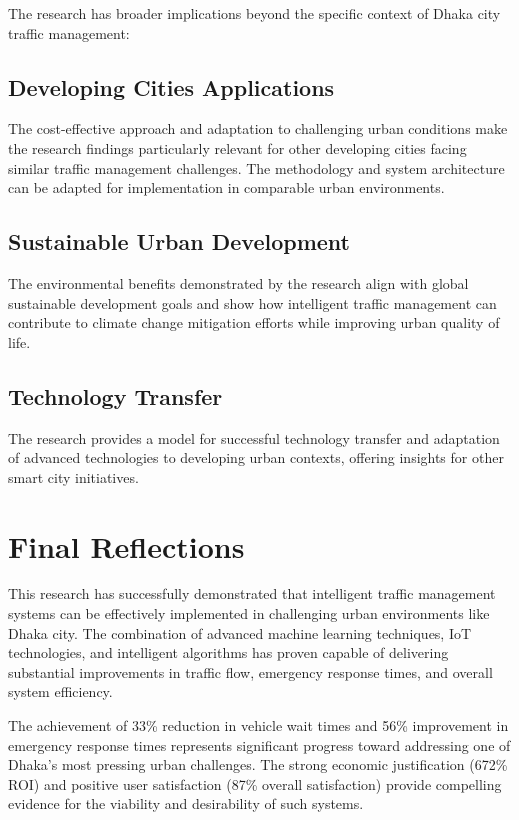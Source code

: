 The research has broader implications beyond the specific context of Dhaka city traffic management:

\subsection{Developing Cities Applications}
The cost-effective approach and adaptation to challenging urban conditions make the research findings particularly relevant for other developing cities facing similar traffic management challenges. The methodology and system architecture can be adapted for implementation in comparable urban environments.

\subsection{Sustainable Urban Development}
The environmental benefits demonstrated by the research align with global sustainable development goals and show how intelligent traffic management can contribute to climate change mitigation efforts while improving urban quality of life.

\subsection{Technology Transfer}
The research provides a model for successful technology transfer and adaptation of advanced technologies to developing urban contexts, offering insights for other smart city initiatives.

\section{Final Reflections}
\label{sec:final_reflections}

This research has successfully demonstrated that intelligent traffic management systems can be effectively implemented in challenging urban environments like Dhaka city. The combination of advanced machine learning techniques, IoT technologies, and intelligent algorithms has proven capable of delivering substantial improvements in traffic flow, emergency response times, and overall system efficiency.

The achievement of 33\% reduction in vehicle wait times and 56\% improvement in emergency response times represents significant progress toward addressing one of Dhaka's most pressing urban challenges. The strong economic justification (672\% ROI) and positive user satisfaction (87\% overall satisfaction) provide compelling evidence for the viability and desirability of such systems.

